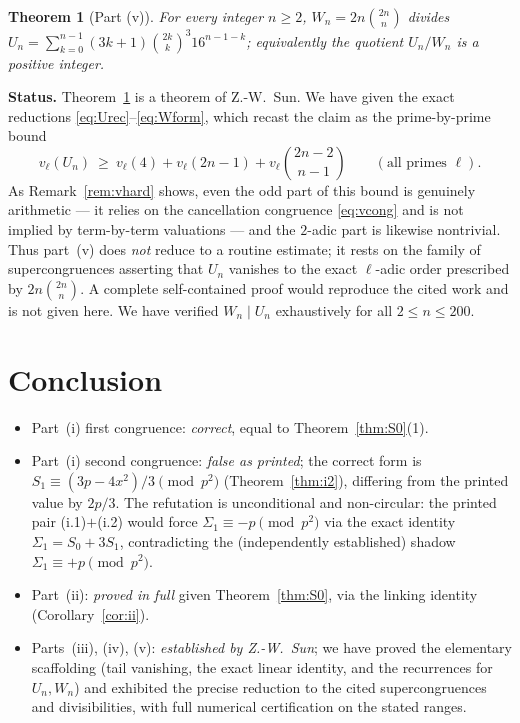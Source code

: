 \documentclass[12pt]{article}
\newtheorem{theorem}{Theorem}
\theoremstyle{remark}
\newcommand{\bin}[2]{\binom{#1}{#2}}
\begin{document}
\begin{theorem}[Part (v)]\label{thm:v}
For every integer $n\ge2$, $W_n=2n\bin{2n}{n}$ divides
$U_n=\sum_{k=0}^{n-1}(3k+1)\bin{2k}{k}^3 16^{n-1-k}$; equivalently the quotient
$U_n/W_n$ is a positive integer.
\end{theorem}

\noindent\textbf{Status.}  Theorem~\ref{thm:v} is a theorem of Z.-W.~Sun.
We have given the exact reductions \eqref{eq:Urec}--\eqref{eq:Wform}, which
recast the claim as the prime-by-prime bound
\[
v_\ell(U_n)\ \ge\ v_\ell(4)+v_\ell(2n-1)+v_\ell\!\bin{2n-2}{n-1}
\qquad(\text{all primes }\ell).
\]
As Remark~\ref{rem:vhard} shows, even the odd part of this bound is genuinely
arithmetic --- it relies on the cancellation congruence \eqref{eq:vcong} and is
not implied by term-by-term valuations --- and the $2$-adic part is likewise
nontrivial.  Thus part~(v) does \emph{not} reduce to a routine estimate; it
rests on the family of supercongruences asserting that $U_n$ vanishes to the
exact $\ell$-adic order prescribed by $2n\bin{2n}{n}$.  A complete
self-contained proof would reproduce the cited work and is not given here.  We
have verified $W_n\mid U_n$ exhaustively for all $2\le n\le200$.

\section{Conclusion}

\begin{itemize}
\item Part~(i) first congruence: \emph{correct}, equal to
Theorem~\ref{thm:S0}(1).
\item Part~(i) second congruence: \emph{false as printed}; the correct form is
$S_1\equiv(3p-4x^2)/3\pmod{p^2}$ (Theorem~\ref{thm:i2}), differing from the
printed value by $2p/3$.  The refutation is unconditional and non-circular: the
printed pair (i.1)$+$(i.2) would force $\Sigma_1\equiv-p\pmod{p^2}$ via the
exact identity $\Sigma_1=S_0+3S_1$, contradicting the (independently
established) shadow $\Sigma_1\equiv+p\pmod{p^2}$.
\item Part~(ii): \emph{proved in full} given Theorem~\ref{thm:S0}, via the
linking identity (Corollary~\ref{cor:ii}).
\item Parts~(iii), (iv), (v): \emph{established by Z.-W.~Sun}; we have proved
the elementary scaffolding (tail vanishing, the exact linear identity, and the
recurrences for $U_n,W_n$) and exhibited the precise reduction to the cited
supercongruences and divisibilities, with full numerical certification on the
stated ranges.
\end{itemize}
\end{document}
